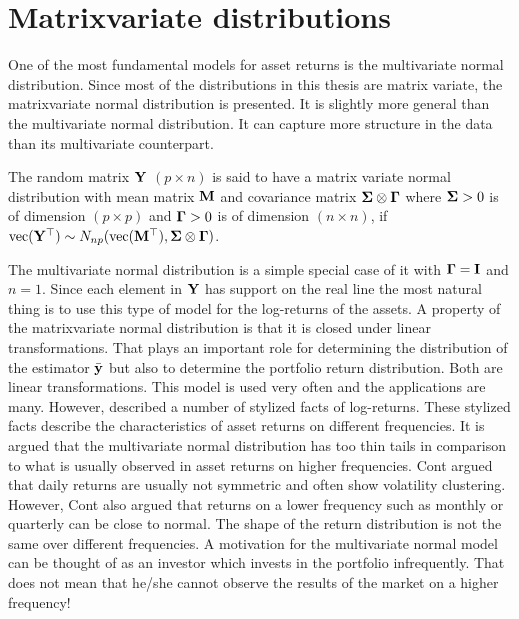 \documentclass[12pt, oneside]{book}\usepackage{knitr}
\begin{document}
{\section{Matrixvariate distributions}
One of the most fundamental models for asset returns is the multivariate normal distribution. 
Since most of the distributions in this thesis are matrix variate, the matrixvariate normal distribution is presented. 
It is slightly more general than the multivariate normal distribution. 
It can capture more structure in the data than its multivariate counterpart.
\begin{definition}\label{def:matrixnormal}
	The random matrix $\mathbf{Y}$ $(p \times n)$ is said to have a matrix variate normal distribution with mean matrix $\mathbf{M}$ and covariance matrix $\mathbf{\Sigma} \otimes \boldsymbol{\Gamma}$ where $\mathbf{\Sigma} > 0$ is of dimension $(p \times p)$ and $\boldsymbol{\Gamma} >0$ is of dimension $(n \times n)$, if $\operatorname{vec}(\mathbf{Y}^\top) \sim N_{np}(\operatorname{vec}(\mathbf{M}^\top), \mathbf{\Sigma} \otimes \boldsymbol{\Gamma})$.
\end{definition}
The multivariate normal distribution is a simple special case of it with $\boldsymbol{\Gamma} = \mathbf{I}$ and $n=1$.
Since each element in $\mathbf{Y}$ has support on the real line the most natural thing is to use this type of model for the log-returns of the assets.
A property of the matrixvariate normal distribution is that it is closed under linear transformations.
That plays an important role for determining the distribution of the estimator $\bar{\mathbf{y}}$ but also to determine the portfolio return distribution.
Both are linear transformations.
This model is used very often and the applications are many.
However, \citet{cont2001empirical} described a number of stylized facts of log-returns. 
These stylized facts describe the characteristics of asset returns on different frequencies.  
It is argued that the multivariate normal distribution has too thin tails in comparison to what is usually observed in asset returns on higher frequencies.
Cont argued that daily returns are usually not symmetric and often show volatility clustering.
However, Cont also argued that returns on a lower frequency such as monthly or quarterly can be close to normal.
The shape of the return distribution is not the same over different frequencies. 
A motivation for the multivariate normal model can be thought of as an investor which invests in the portfolio infrequently.
That does not mean that he/she cannot observe the results of the market on a higher frequency!

}
\end{document}
